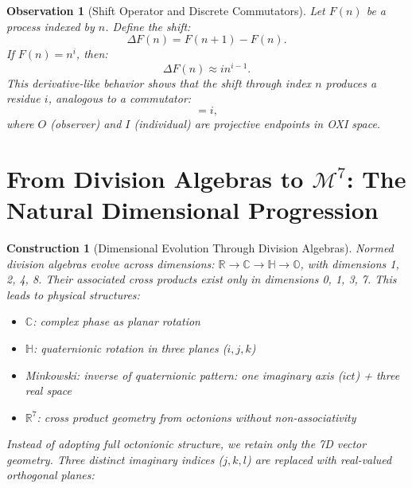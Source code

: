 \documentclass{article}
\newtheorem{observation}{Observation}
\newtheorem{construction}{Construction}
\begin{document}
\begin{observation}[Shift Operator and Discrete Commutators]
Let \( F(n) \) be a process indexed by \( n \). Define the shift:
\begin{equation}
\Delta F(n) = F(n+1) - F(n).
\end{equation}
If \( F(n) = n^i \), then:
\begin{equation}
\Delta F(n) \approx i n^{i-1}.
\end{equation}
This derivative-like behavior shows that the shift through index \( n \) produces a residue \( i \), analogous to a commutator:
\begin{equation}
[O, I] = i,
\end{equation}
where \( O \) (observer) and \( I \) (individual) are projective endpoints in OXI space.
\end{observation}



\section{From Division Algebras to \( \mathcal{M}^7 \): The Natural Dimensional Progression}

\begin{construction}[Dimensional Evolution Through Division Algebras]
Normed division algebras evolve across dimensions: \( \mathbb{R} \rightarrow \mathbb{C} \rightarrow \mathbb{H} \rightarrow \mathbb{O} \), with dimensions 1, 2, 4, 8. Their associated cross products exist only in dimensions 0, 1, 3, 7. This leads to physical structures:

\begin{itemize}
  \item \( \mathbb{C} \): complex phase as planar rotation
  \item \( \mathbb{H} \): quaternionic rotation in three planes (\( i, j, k \))
  \item Minkowski: inverse of quaternionic pattern: one imaginary axis (\( ict \)) + three real space
  \item \( \mathbb{R}^7 \): cross product geometry from octonions without non-associativity
\end{itemize}

Instead of adopting full octonionic structure, we retain only the 7D vector geometry. Three distinct imaginary indices (\( j, k, l \)) are replaced with real-valued orthogonal planes:
\end{construction}
\end{document}

